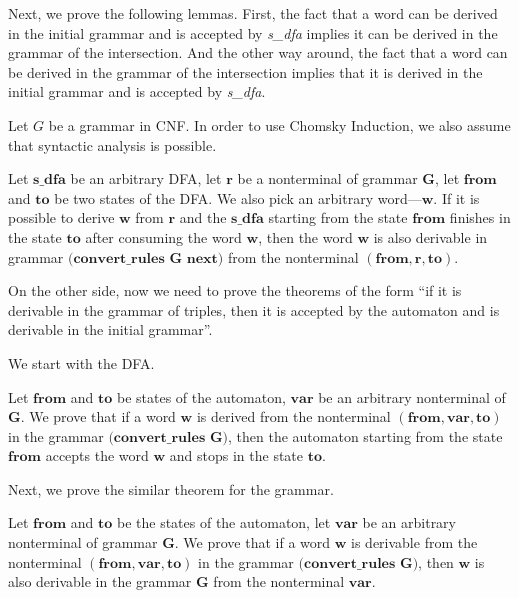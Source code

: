 \documentclass[runningheads]{llncs}
\begin{document}
Next, we prove the following lemmas. First, the fact that a word can be derived in the initial grammar and is accepted by \textit{s\_dfa} implies it can be derived in the grammar of the intersection. And the other way around, the fact that a word can be derived in the grammar of the intersection implies that it is derived in the initial grammar and is accepted by \textit{s\_dfa}.

Let $G$ be a grammar in CNF. In order to use Chomsky Induction, we also assume that syntactic analysis is possible.

\begin{theorem}
    Let $ \textbf{s\_dfa} $ be an arbitrary DFA, let $\textbf{r}$ be a nonterminal of grammar $\textbf{G}$, let $ \textbf{from} $ and $ \textbf{to} $ be two states of the DFA. We also pick an arbitrary word---$\textbf{w}$. If it is possible to derive $\textbf{w}$ from $\textbf{r}$ and the $ \textbf{s\_dfa} $ starting from the state $ \textbf{from} $ finishes in the state $ \textbf{to} $ after consuming the word $\textbf{w}$, then the word $\textbf{w}$ is also derivable in grammar
    $ \textbf{(convert\_rules~G~next}) $ from the nonterminal $(\textbf{from}, \textbf{r}, \textbf{to})$.
\end{theorem}

On the other side, now we need to prove the theorems of the form  ``if it is derivable in the grammar of triples, then it is accepted by the automaton and is derivable in the initial grammar''.

We start with the DFA.

\begin{theorem}
	Let $ \textbf{from} $ and $ \textbf{to} $ be states of the automaton, $ \textbf{var} $ be an arbitrary nonterminal of $\textbf{G}$. We prove that if a word $\textbf{w}$ is derived from the nonterminal $ (\textbf{from}, \textbf{var}, \textbf{to}) $ in the grammar $ \textbf{(convert\_rules~G)} $, then the automaton starting from the state $ \textbf{from} $ accepts the word $\textbf{w}$ and stops in the state $\textbf{to} $.
\end{theorem}

Next, we prove the similar theorem for the grammar.

\begin{theorem}
	Let $ \textbf{from} $ and $ \textbf{to} $ be the states of the automaton, let $ \textbf{var} $ be an arbitrary nonterminal of grammar \textbf{G}. We prove that if a word $\textbf{w}$ is derivable from the nonterminal $ (\textbf{from}, \textbf{var}, \textbf{to}) $ in the grammar $ \textbf{(convert\_rules~G)}$, then $\textbf{w}$ is also derivable in the grammar $\textbf{G}$ from the nonterminal $ \textbf{var} $.
\end{theorem}
\end{document}
